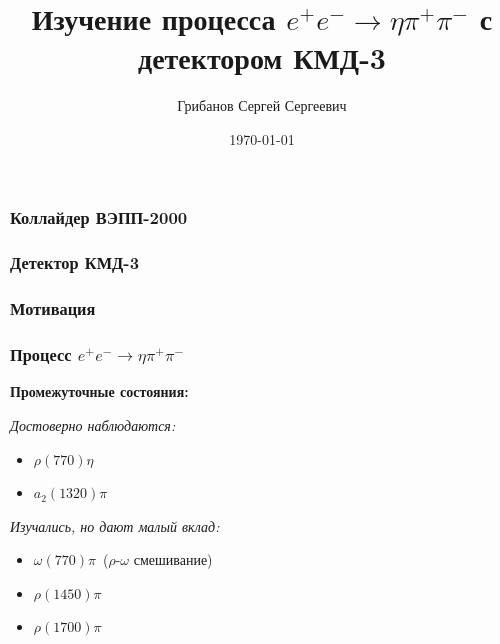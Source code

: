 \documentclass{beamer}
\title[$e^+e^-\rightarrow{}\eta\pi^+\pi^-$]{Изучение процесса $e^+e^-\to\eta\pi^+\pi^-$ с детектором КМД-3}
\author{Грибанов Сергей Сергеевич}
\date{\today}
\begin{document}
\frame{\titlepage}

\begin{frame}
  \frametitle{Коллайдер ВЭПП-2000}
\end{frame}

\begin{frame}
  \frametitle{Детектор КМД-3}
\end{frame}

\begin{frame}
  \frametitle{Мотивация}
\end{frame}

\begin{frame}
  \frametitle{Процесс $e^+e^-\to\eta\pi^+\pi^-$}
  \scriptsize
  \centering
  \textbf{Промежуточные состояния:}

  \begin{minipage}[t]{0.4\linewidth}
    \textit{Достоверно наблюдаются:}
    \begin{itemize}
    \item $\rho(770)\eta$
    \item $a_2(1320)\pi$
    \end{itemize}
  \end{minipage}
  \begin{minipage}[t]{0.4\linewidth}
    \textit{Изучались, но дают малый вклад:}
    \begin{itemize}
      \item $\omega(770)\pi$~($\rho$-$\omega$ смешивание)
      \item $\rho(1450)\pi$
      \item $\rho(1700)\pi$
    \end{itemize}
  \end{minipage}
\end{frame}
\end{document}
